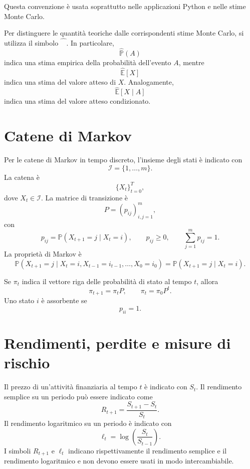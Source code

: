 \documentclass[12pt,a4paper]{article}
\newcommand{\E}{\mathbb{E}}
\newcommand{\Prob}{\mathbb{P}}
\newcommand{\1}{\mathbf{1}}
\begin{document}
Questa convenzione \`e usata soprattutto nelle applicazioni Python e nelle
stime Monte Carlo.

Per distinguere le quantit\`a teoriche dalle corrispondenti stime
Monte Carlo, si utilizza il simbolo $\widehat{\phantom{X}}$. In particolare,
\[
\widehat{\Prob}(A)
\]
indica una stima empirica della probabilit\`a dell'evento $A$, mentre
\[
\widehat{\E}[X]
\]
indica una stima del valore atteso di $X$. Analogamente,
\[
\widehat{\E}[X\mid A]
\]
indica una stima del valore atteso condizionato.

\section{Catene di Markov}

Per le catene di Markov in tempo discreto, l'insieme degli stati \`e indicato
con
\[
 \mathcal{I}=\{1,\ldots,m\}.
\]
La catena \`e
\[
 \{X_t\}_{t=0}^{T},
\]
dove $X_t\in\mathcal{I}$. La matrice di transizione \`e
\[
 P=(p_{ij})_{i,j=1}^{m},
\]
con
\[
 p_{ij}=\Prob(X_{t+1}=j\mid X_t=i),
 \qquad
 p_{ij}\geq 0,
 \qquad
 \sum_{j=1}^{m}p_{ij}=1.
\]
La propriet\`a di Markov \`e
\[
 \Prob(X_{t+1}=j\mid X_t=i,X_{t-1}=i_{t-1},\ldots,X_0=i_0)
 =\Prob(X_{t+1}=j\mid X_t=i).
\]

Se $\pi_t$ indica il vettore riga delle probabilit\`a di stato al tempo $t$,
allora
\[
 \pi_{t+1}=\pi_t P,
 \qquad
 \pi_t=\pi_0P^t.
\]
Uno stato $i$ \`e assorbente se
\[
 p_{ii}=1.
\]

\section{Rendimenti, perdite e misure di rischio}

Il prezzo di un'attivit\`a finanziaria al tempo $t$ \`e indicato con $S_t$.
Il rendimento semplice su un periodo pu\`o essere indicato come
\[
 R_{t+1}=\frac{S_{t+1}-S_t}{S_t}.
\]
Il rendimento logaritmico su un periodo \`e indicato con
\[
 \ell_t=\log\left(\frac{S_t}{S_{t-1}}\right).
\]
I simboli $R_{t+1}$ e $\ell_t$ indicano rispettivamente il rendimento semplice
e il rendimento logaritmico e non devono essere usati in modo intercambiabile.
\end{document}
